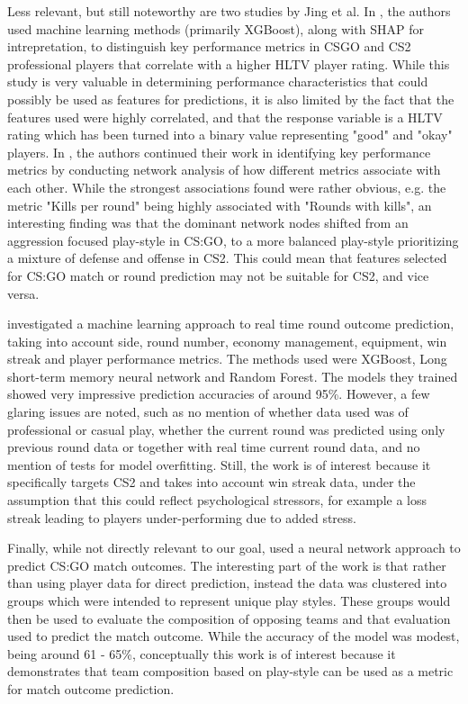 \documentclass[twoside,11pt]{article}
\begin{document}
Less relevant, but still noteworthy are two studies by Jing et al. In \cite{jing2025_cs}, the
authors used machine learning methods (primarily XGBoost), along with SHAP for intrepretation, to
distinguish key performance metrics in CSGO and CS2 professional players that correlate with a
higher HLTV player rating. While this study is very valuable in determining performance
characteristics that could possibly be used as features for predictions, it is also limited by the
fact that the features used were highly correlated, and that the response variable is a HLTV rating
which has been turned into a binary value representing "good" and "okay" players. In
\cite{jing2026network_cs}, the authors continued their work in identifying key performance metrics
by conducting network analysis of how different metrics associate with each other. While the
strongest associations found were rather obvious, e.g. the metric "Kills per round" being highly
associated with "Rounds with kills", an interesting finding was that the dominant network nodes
shifted from an aggression focused play-style in CS:GO, to a more balanced play-style prioritizing a
mixture of defense and offense in CS2. This could mean that features selected for CS:GO match or
round prediction may not be suitable for CS2, and vice versa.

\cite{eshrah2025cs2analyticsapp_cs} investigated a machine learning approach to real time round
outcome prediction, taking into account side, round number, economy management, equipment, win
streak and player performance metrics. The methods used were XGBoost, Long short-term memory neural
network and Random Forest. The models they trained showed very impressive prediction accuracies of
around 95\%. However, a few glaring issues are noted, such as no mention of whether data used was of
professional or casual play, whether the current round was predicted using only previous round data
or together with real time current round data, and no mention of tests for model overfitting. Still,
the work is of interest because it specifically targets CS2 and takes into account win streak data,
under the assumption that this could reflect psychological stressors, for example a loss streak
leading to players under-performing due to added stress.

Finally, while not directly relevant to our goal, \cite{bjorklund2018_cs} used a neural network
approach to predict CS:GO match outcomes. The interesting part of the work is that rather than using
player data for direct prediction, instead the data was clustered into groups which were intended to
represent unique play styles. These groups would then be used to evaluate the composition of
opposing teams and that evaluation used to predict the match outcome. While the accuracy of the
model was modest, being around 61 - 65\%, conceptually this work is of interest because it
demonstrates that team composition based on play-style can be used as a metric for match outcome
prediction.
\end{document}

